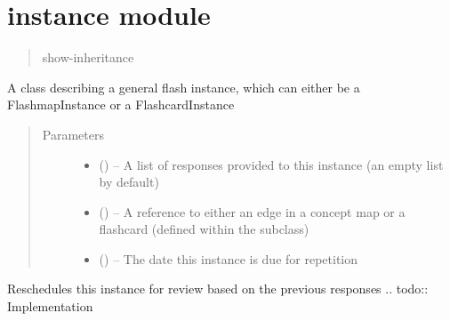 \documentclass[letterpaper,10pt,english]{sphinxmanual}
\begin{document}
\chapter{instance module}
\label{\detokenize{instance:module-instance}}\label{\detokenize{instance::doc}}\label{\detokenize{instance:instance-module}}\begin{quote}\begin{description}
\item[{show-inheritance}] \leavevmode
\end{description}\end{quote}

\begin{fulllineitems}
\label{\detokenize{instance:instance.Instance}}
A class describing a general flash instance, which can either be a FlashmapInstance or a FlashcardInstance
\begin{quote}\begin{description}
\item[{Parameters}] \leavevmode\begin{itemize}
\item {} 
 (\sphinxstyleliteralemphasis{(}\sphinxstyleliteralemphasis{)}\sphinxstyleliteralemphasis{}\sphinxstyleliteralemphasis{)}\sphinxstyleliteralemphasis{}) -- A list of responses provided to this instance (an empty list by default)

\item {} 
 () -- A reference to either an edge in a concept map or a flashcard (defined within the subclass)

\item {} 
 () -- The date this instance is due for repetition

\end{itemize}

\end{description}\end{quote}

\begin{fulllineitems}
\label{\detokenize{instance:instance.Instance.schedule}}
Reschedules this instance for review based on the previous responses
.. todo:: Implementation

\end{fulllineitems}


\end{fulllineitems}
\end{document}
